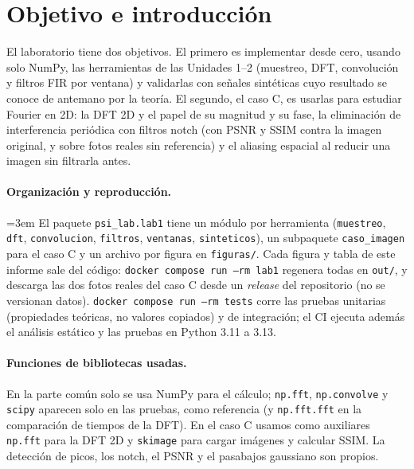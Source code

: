 %

\section{Objetivo e introducción}
\label{sec:introduccion}

El laboratorio tiene dos objetivos. El primero es implementar desde cero, usando solo NumPy, las
herramientas de las Unidades 1--2 (muestreo, DFT, convolución y filtros FIR por ventana) y validarlas con
señales sintéticas cuyo resultado se conoce de antemano por la teoría. El segundo, el caso C, es usarlas
para estudiar Fourier en 2D: la DFT 2D y el papel de su magnitud y su fase, la eliminación de interferencia
periódica con filtros notch (con PSNR y SSIM contra la imagen original, y sobre fotos reales sin referencia)
y el aliasing espacial al reducir una imagen sin filtrarla antes.

\paragraph{Organización y reproducción.}
{\emergencystretch=3em  %
El paquete \texttt{psi\_lab.\allowbreak lab1} tiene un módulo por herramienta (\texttt{muestreo}, \texttt{dft},
\texttt{convolucion}, \texttt{filtros}, \texttt{ventanas}, \texttt{sinteticos}), un subpaquete
\texttt{caso\_imagen} para el caso C y un archivo por figura en \texttt{figuras/}. Cada figura y tabla de
este informe sale del código: \texttt{docker compose run --rm lab1} regenera todas en \texttt{out/}, y
descarga las dos fotos reales del caso C desde un \emph{release} del repositorio (no se versionan datos).
\texttt{docker compose run --rm tests} corre las pruebas unitarias (propiedades teóricas, no valores
copiados) y de integración; el CI ejecuta además el análisis estático y las pruebas en Python 3.11 a 3.13.\par}

\paragraph{Funciones de bibliotecas usadas.}
En la parte común solo se usa NumPy para el cálculo; \texttt{np.fft}, \texttt{np.convolve} y
\texttt{scipy} aparecen solo en las pruebas, como referencia (y \texttt{np.fft.fft} en la comparación
de tiempos de la DFT). En el caso C usamos como auxiliares \texttt{np.fft} para la DFT 2D y
\texttt{skimage} para cargar imágenes y calcular SSIM. La detección de picos, los notch, el PSNR y
el pasabajos gaussiano son propios.
